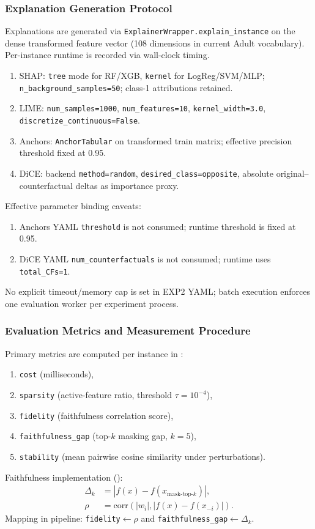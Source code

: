\documentclass[twoside,11pt]{article}
\begin{document}
\subsubsection{Explanation Generation Protocol}
Explanations are generated via \texttt{ExplainerWrapper.explain\_instance} on the
dense transformed feature vector (108 dimensions in current Adult vocabulary).
Per-instance runtime is recorded via wall-clock timing.
\begin{enumerate}[leftmargin=*]
    \item SHAP: \texttt{tree} mode for RF/XGB, \texttt{kernel} for LogReg/SVM/MLP; \texttt{n\_background\_samples=50}; class-1 attributions retained.
    \item LIME: \texttt{num\_samples=1000}, \texttt{num\_features=10}, \texttt{kernel\_width=3.0}, \texttt{discretize\_continuous=False}.
    \item Anchors: \texttt{AnchorTabular} on transformed train matrix; effective precision threshold fixed at 0.95.
    \item DiCE: backend \texttt{method=random}, \texttt{desired\_class=opposite}, absolute original--counterfactual deltas as importance proxy.
\end{enumerate}
Effective parameter binding caveats:
\begin{enumerate}[leftmargin=*]
    \item Anchors YAML \texttt{threshold} is not consumed; runtime threshold is fixed at 0.95.
    \item DiCE YAML \texttt{num\_counterfactuals} is not consumed; runtime uses \texttt{total\_CFs=1}.
\end{enumerate}
No explicit timeout/memory cap is set in EXP2 YAML; batch execution enforces one
evaluation worker per experiment process.

\subsubsection{Evaluation Metrics and Measurement Procedure}
Primary metrics are computed per instance in
:
\begin{enumerate}[leftmargin=*]
    \item \texttt{cost} (milliseconds),
    \item \texttt{sparsity} (active-feature ratio, threshold $\tau=10^{-4}$),
    \item \texttt{fidelity} (faithfulness correlation score),
    \item \texttt{faithfulness\_gap} (top-$k$ masking gap, $k=5$),
    \item \texttt{stability} (mean pairwise cosine similarity under perturbations).
\end{enumerate}
Faithfulness implementation ():
\begin{align}
\Delta_k &= \left|f(x)-f\left(x_{\text{mask-top-}k}\right)\right|,\\
\rho &= \mathrm{corr}\left(|w_i|,\left|f(x)-f(x_{-i})\right|\right).
\end{align}
Mapping in pipeline: \texttt{fidelity}$\leftarrow \rho$ and
\texttt{faithfulness\_gap}$\leftarrow \Delta_k$.
\end{document}

